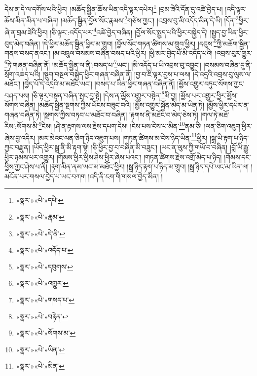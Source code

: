 དེས་ན་དེ་ལ་དགོས་པའི་ཕྱིར། །མཆོད་སྦྱིན་ཆོས་ཡིན་འདི་ལྟར་དཔེར།\footnote{«སྣར་»«པེ་»དཔེ།} །བྲམ་ཟེའི་དོན་དུ་འཚེ་བྱེད་པ། །འདི་ལྟར་ཆོས་མིན་མིན་པ་བཞིན། །མཆོད་སྦྱིན་བྱོལ་སོང་རྣམས་\footnote{«སྣར་»«པེ་»རྣམ་}གཙེས་ཀྱང་། །འབྲས་བུ་མི་འདོད་མིན་དེ་ཡི། །དོན་\footnote{«སྣར་»«པེ་»དེ་ནི་}ཕྱིར་ཞེ་ན་བྲམ་ཟེའི་ཕྱིར། །ཅི་ལྟར་:འདོད་པར་\footnote{«སྣར་»«པེ་»འདོད་པ་}འཚེ་བྱེད་བཞིན། །བྱོལ་སོང་སྤྱད་པའི་ཕྱིར་བསྐྱེད་དེ། །སྤྱད་བྱ་ཡིན་ཕྱིར་བུད་མེད་བཞིན། །དེ་ཕྱིར་མཆོད་སྦྱིན་ཕྱིར་མ་གྲུབ། །བྱོལ་སོང་གཏན་ཚིགས་མ་གྲུབ་ཕྱིར། །དབུས་\footnote{«སྣར་»«པེ་»དབུགས་}ཀྱི་མཆོག་སྦྱིན་གནས་བསད་ནའང་། །མ་འཁྲུལ་བསམས་བཞིན་བསད་པའི་ཕྱིར། །ཕྱི་མར་བྱེད་པོ་མི་འདོད་པའི། །འབྲས་བུར་གྱུར་\footnote{«སྣར་»«པེ་»འགྱུར་}ཏེ་གཞན་བཞིན་ནོ། །མཆོད་སྦྱིན་ལ་ནི་:བསད་པ་\footnote{«སྣར་»«པེ་»གསད་པ་}ཡང་། །མི་འདོད་པ་ཡི་འབྲས་བུ་འབྱུང་། །བསམས་བཞིན་དུ་ནི་སྲོག་འཆད་པའི། །སྡུག་བསྔལ་བསྐྱེད་ཕྱིར་གཞན་བཞིན་ནོ། །བྱ་བ་ཇི་ལྟར་བྱས་པ་ལས། །དེ་འདྲའི་འབྲས་བུ་ལུས་ལ་མཐོང་། །བྱེད་པོ་དེ་འདྲའི་མ་མཐོང་ཡང་། །བསད་པ་ཡིན་ཕྱིར་གཞན་བཞིན་ནོ། །མྱོས་འགྱུར་བཏུང་སོགས་ཀྱང་བཤད་པས། །ཅི་ལྟར་བསྟན་བཞིན་སྤང་བྱ་སྟེ། །དེས་ན་མྱོས་འགྱུར་བསྟེན་\footnote{«སྣར་»«པེ་»བརྟེན་}མི་བྱ། །མྱོས་པར་འགྱུར་ཕྱིར་མྱོས་སོགས་བཞིན། །མཆོད་སྦྱིན་སྔགས་ཀྱིས་ཡོངས་བཟུང་བའི། །མྱོས་འགྱུར་སྐྱོན་མེད་མ་ཡིན་ཏེ། །མྱོས་ཕྱིར་དཔེར་ན་གཞན་བཞིན་ཏེ། །སྔགས་ཀྱིས་བཏབ་པ་མཐོང་བ་བཞིན། །རྟགས་ནི་མཐོང་བ་མེད་ཅེས་ཏེ། །གལ་ཏེ་མཐོ་རིས་:སོགས་མི་\footnote{«སྣར་»«པེ་»སོགས་མ་}ངེས། །ཤེ་ན་རྟགས་ལས་རྗེས་དཔག་དེས། །ངེས་པས་ངེས་པ་མིན་\footnote{«སྣར་»«པེ་»ཡིན་}ནམ་ཅི། །ལན་ཅིག་འཇུག་ཕྱིར་ཞེས་བྱ་འདིར། །མར་མེའང་ལན་ཅིག་ཉིད་འཇུག་པས། །གཏན་ཚིགས་མ་ངེས་ཉིད་ཡིན་\footnote{«སྣར་»«པེ་»མིན་}ཕྱིར། །སྒྲ་ཡི་རྟག་པ་ཉིད་ཀྱང་བརྫུན། །ཡོད་ཕྱིར་སྒྲ་ནི་མི་རྟག་སྟེ། །ཅི་ཕྱིར་བྱ་བ་བཞིན་མི་བཟུང་། །ཡང་ན་ལུས་ཀྱི་གཡོ་བ་བཞིན། །བློ་ཡི་རྒྱུ་ཕྱིར་ཉམས་པར་འགྱུར། །གོམས་ཕྱིར་ཕྱིས་ཤེས་ཕྱིར་ཞེས་པའང་། །གཏན་ཚིགས་རྗེས་འགྲོ་མེད་པ་ཉིད། །གོམས་དང་ཕྱིས་ཀྱང་ཤེས་པ་ནི། །རྟག་མིན་ནམ་ཡང་མ་མཐོང་ཕྱིར། །སྒྲ་ཉིད་རྟག་པ་ཉིད་མ་གྲུབ། །སྒྲ་ཉིད་དཔེ་ཡང་མ་ཡིན་ལ། །མངོན་པར་གསལ་བྱེད་པ་ཡང་བཀག །འདི་ནི་ངག་གི་གསལ་བྱེད་མིན། །
